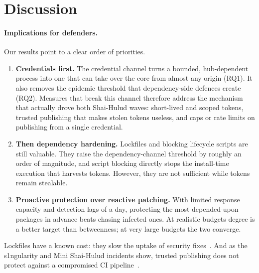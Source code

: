 \section{Discussion}\label{sec:discussion}

\paragraph{Implications for defenders.}
Our results point to a clear order of priorities.
\begin{enumerate}
  \item \textbf{Credentials first.} The credential channel turns a bounded, hub-dependent process into
        one that can take over the core from almost any origin (RQ1). It also removes the epidemic
        threshold that dependency-side defences create (RQ2). Measures that break this channel therefore
        address the mechanism that actually drove both Shai-Hulud waves: short-lived and scoped tokens,
        trusted publishing that makes stolen tokens useless, and caps or rate limits on publishing from a
        single credential.
  \item \textbf{Then dependency hardening.} Lockfiles and blocking lifecycle scripts are still valuable.
        They raise the dependency-channel threshold by roughly an order of magnitude, and script blocking
        directly stops the install-time execution that harvests tokens. However, they are not sufficient
        while tokens remain stealable.
  \item \textbf{Proactive protection over reactive patching.} With limited response capacity and
        detection lags of a day, protecting the most-depended-upon packages in advance beats chasing
        infected ones. At realistic budgets degree is a better target than betweenness; at very large
        budgets the two converge.
\end{enumerate}
Lockfiles have a known cost: they slow the uptake of security fixes~\citep{pinckney2023semver}. And as
the s1ngularity and Mini Shai-Hulud incidents show, trusted publishing does not protect against a
compromised CI pipeline~\citep{wiz2025singularity,unit422026npmlandscape}.

